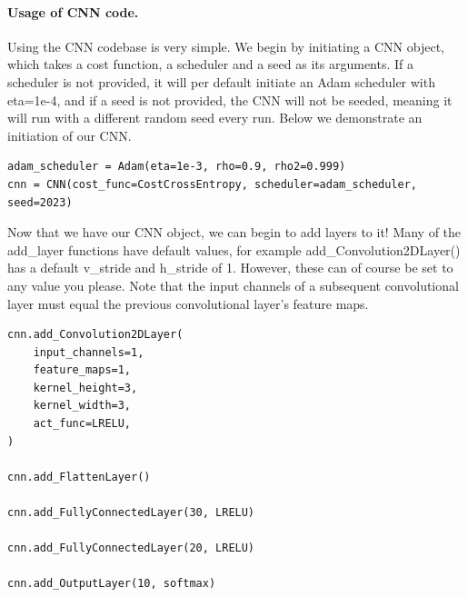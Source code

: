 \documentclass[%
oneside,                 %
final,                   %
10pt]{article}
\begin{document}
\paragraph{Usage of CNN code.}
Using the CNN codebase is very simple. We begin by initiating a CNN
object, which takes a cost function, a scheduler and a seed as its
arguments. If a scheduler is not provided, it will per default
initiate an Adam scheduler with eta=1e-4, and if a seed is not
provided, the CNN will not be seeded, meaning it will run with a
different random seed every run. Below we demonstrate an initiation of
our CNN.




\begin{verbatim}
adam_scheduler = Adam(eta=1e-3, rho=0.9, rho2=0.999)
cnn = CNN(cost_func=CostCrossEntropy, scheduler=adam_scheduler, seed=2023)

\end{verbatim}


Now that we have our CNN object, we can begin to add layers to it!
Many of the add_layer functions have default values, for example
add_Convolution2DLayer() has a default v_stride and h_stride of
1. However, these can of course be set to any value you please. Note
that the input channels of a subsequent convolutional layer must equal
the previous convolutional layer's feature maps.

















\begin{verbatim}
cnn.add_Convolution2DLayer(
    input_channels=1,
    feature_maps=1,
    kernel_height=3,
    kernel_width=3,
    act_func=LRELU,
)

cnn.add_FlattenLayer()

cnn.add_FullyConnectedLayer(30, LRELU)

cnn.add_FullyConnectedLayer(20, LRELU)

cnn.add_OutputLayer(10, softmax)

\end{verbatim}
\end{document}
